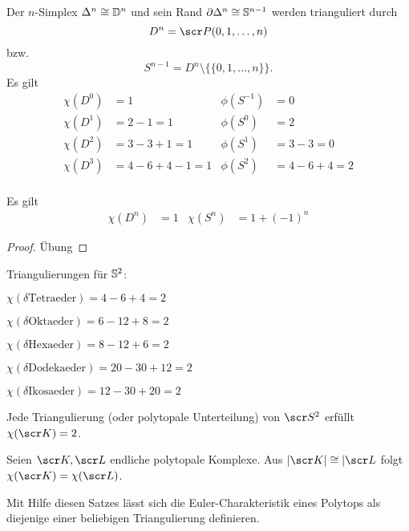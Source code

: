 \begin{ex}
	Der $n$-Simplex $\Delta^n \homeomorphic \D^n$ und sein Rand $\boundary \Delta^n \homeomorphic \S^{n-1}$ werden trianguliert durch
	\[
		D^n
		= \scr P({0,1, \dotsc, n})
	\]
	bzw.
	\[
		S^{n-1}
		= D^n \setminus \{ \{0,1,\dotsc,n\} \}.
	\]
	Es gilt
	\begin{align*}
		\chi(D^0) &= 1 &
		\phi(S^{-1}) &= 0 \\
		\chi(D^1) &= 2-1 = 1 &
		\phi(S^{0}) &= 2 \\
		\chi(D^2) &= 3 - 3 + 1 = 1 &
		\phi(S^{1}) &= 3 - 3 = 0 \\
		\chi(D^3) &= 4 - 6 + 4 - 1 = 1 &
		\phi(S^{2}) &= 4 - 6 + 4 = 2 \\
	\end{align*}
\end{ex}

\begin{prop}
	Es gilt
	\begin{align*}
		\chi(D^n) &= 1 &
		\chi(S^n) &= 1 + (-1)^n
	\end{align*}
	\begin{proof}
		Übung
	\end{proof}
\end{prop}

\begin{ex}
	Triangulierungen für $\S^2$:
	\begin{description}
		\item
			$\chi(\delta \text{Tetraeder}) = 4 - 6 + 4 = 2$
		\item
			$\chi(\delta \text{Oktaeder}) = 6 - 12 + 8 = 2$
		\item
			$\chi(\delta \text{Hexaeder}) = 8 - 12 + 6 = 2$
		\item
			$\chi(\delta \text{Dodekaeder}) = 20 - 30 + 12= 2$
		\item
			$\chi(\delta \text{Ikosaeder}) = 12 - 30 + 20= 2$
	\end{description}
\end{ex}

\begin{st}
	Jede Triangulierung (oder polytopale Unterteilung) von $\scr S^2$ erfüllt $\chi(\scr K) = 2$.
\end{st}

\begin{st}
	Seien $\scr K, \scr L$ endliche polytopale Komplexe.
	Aus $|\scr K| \homeomorphic |\scr L$ folgt $\chi(\scr K) = \chi(\scr L)$.
	\begin{note}
		Mit Hilfe diesen Satzes lässt sich die Euler-Charakteristik eines Polytops als diejenige einer beliebigen Triangulierung definieren.
	\end{note}
\end{st}


